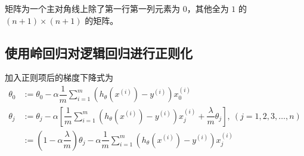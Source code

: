 矩阵为一个主对角线上除了第一行第一列元素为 $0$，其他全为 $1$ 的 $(n + 1) \times (n + 1)$ 的矩阵。

\subsection{使用岭回归对逻辑回归进行正则化}
加入正则项后的梯度下降式为
\begin{equation}
    \begin{aligned}
        \theta_0 &:= \theta_0 - \alpha \dfrac 1m\sum\limits_{i = 1}^m\left(h_\theta\left(x^{(i)}\right) - y^{(i)}\right)x_0^{(i)} \\
        \theta_j &:= \theta_j - \alpha \left[\dfrac 1m\sum\limits_{i = 1}^m\left(h_\theta\left(x^{(i)}\right) 
        - y^{(i)}\right)x_j^{(i)} + \dfrac \lambda m \theta_j\right],\ (j = 1, 2, 3, \dots, n) \\
        &:= \left(1 - \alpha\dfrac\lambda m\right)\theta_j - \alpha \dfrac 1m\sum\limits_{i = 1}^m\left(h_\theta\left(x^{(i)}\right) 
        - y^{(i)}\right)x_j^{(i)}
    \end{aligned}
\end{equation}